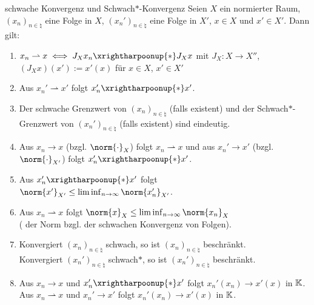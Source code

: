 \begin{Lemma}{schwache Konvergenz und Schwach$\ast$-Konvergenz}
    Seien $X$ ein normierter Raum,
    $(x_n)_{n \in \natural}$ eine Folge in $X$,
    $(x_n')_{n \in \natural}$ eine Folge in $X'$,
    $x \in X$ und
    $x' \in X'$.
    Dann gilt:
    \begin{enumerate}
        \item
        $x_n \rightharpoonup x \iff J_X x_n \xrightharpoonup{\ast} J_X x$ mit
        $J_X\colon X \rightarrow X''$, $(J_X x)(x') := x'(x)$ für $x \in X$, $x' \in X'$

        \item
        Aus $x_n' \rightharpoonup x'$ folgt $x_n' \xrightharpoonup{\ast} x'$.

        \item
        Der schwache Grenzwert von $(x_n)_{n \in \natural}$ (falls existent) und
        der Schwach$\ast$-Grenzwert von $(x_n')_{n \in \natural}$ (falls existent) sind eindeutig.

        \item
        Aus $x_n \to x$ (bzgl. $\norm{\cdot}_X$) folgt $x_n \rightharpoonup x$ und
        aus $x_n' \to x'$ (bzgl. $\norm{\cdot}_{X'}$) folgt $x_n' \xrightharpoonup{\ast} x'$.

        \item
        Aus $x_n' \xrightharpoonup{\ast} x'$ folgt
        $\norm{x'}_{X'} \le \liminf_{n \to \infty} \norm{x_n'}_{X'}$.

        \item
        Aus $x_n \rightharpoonup x$ folgt
        $\norm{x}_X \le \liminf_{n \to \infty} \norm{x_n}_X$\\
        ( der Norm bzgl. der schwachen Konvergenz von Folgen).

        \item
        Konvergiert $(x_n)_{n \in \natural}$ schwach,
        so ist $(x_n)_{n \in \natural}$ beschränkt.\\
        Konvergiert $(x_n')_{n \in \natural}$ schwach$\ast$,
        so ist $(x_n')_{n \in \natural}$ beschränkt.

        \item
        Aus $x_n \to x$ und $x_n' \xrightharpoonup{\ast} x'$ folgt
        $x_n'(x_n) \to x'(x)$ in $\mathbb{K}$.\\
        Aus $x_n \rightharpoonup x$ und $x_n' \to x'$ folgt
        $x_n'(x_n) \to x'(x)$ in $\mathbb{K}$.
    \end{enumerate}
\end{Lemma}

